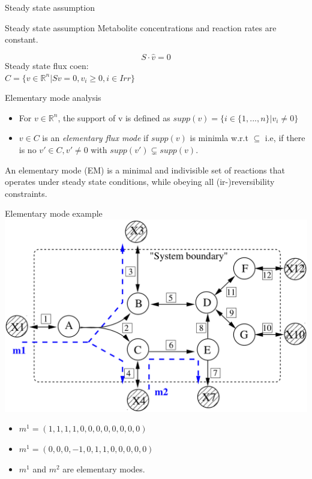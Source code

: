 \documentclass{beamer}
\begin{document}
\begin{frame}{Steady state assumption}    
    \begin{block}{Steady state assumption}
        Metabolite concentrations and reaction rates are constant.
    \end{block}
    \begin{equation}
    S \cdot \hat{v} = 0 
    \end{equation}
    Steady state flux coen: \\
    $C = \{v \in \mathbb{R}^n | Sv = 0, v_i \geq 0, i \in Irr \}$
\end{frame}

\begin{frame}{Elementary mode analysis}
    \begin{itemize}
        \item For $v \in \mathbb{R}^n$, the support of v is defined as 
        $supp(v) = \{i \in \{1, ..., n \} | v_i \neq 0  \}$
    
        \item $v \in C$ is an \emph{elementary flux mode} if $supp(v)$
        is minimla w.r.t $\subseteq$
        i.e, if there is no $v' \in C, v' \neq 0$ with 
        $supp(v') \subsetneq supp(v)$.
    \end{itemize}
    
    
    \begin{definition}
        An elementary mode (EM) is a minimal and indivisible set 
        of reactions that operates under steady state conditions, 
        while obeying all (ir-)reversibility constraints.
    \end{definition}
    
\end{frame}

\begin{frame}{Elementary mode example}
    \includegraphics[width=.7\textwidth]{grafik/EMnet1}
    \begin{itemize}
        \item $m^{1} = (1, 1, 1, 1, 0, 0, 0, 0, 0, 0, 0 ,0)$
        \item $m^{1} = (0, 0, 0, -1, 0, 1, 1, 0, 0, 0, 0 ,0)$
        \item $m^{1}$ and $m^{2}$ are elementary modes.
    \end{itemize}
\end{frame}
\end{document}
